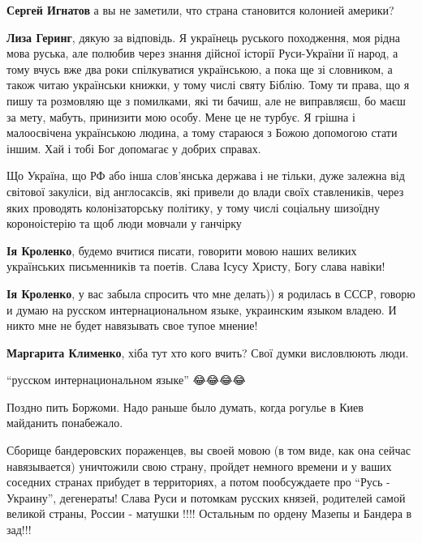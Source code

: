 \begin{itemize}
\begin{itemize}
\textbf{Сергей Игнатов} а вы не заметили, что страна становится колонией америки?

\textbf{Лиза Геринг}, дякую за відповідь. Я українець руського походження, моя
рідна мова руська, але полюбив через знання дійсної історії Руси-України її
народ, а тому вчусь вже два роки спілкуватися українською, а пока ще зі
словником, а також читаю українськи книжки, у тому числі святу Біблію. Тому ти
права, що я пишу та розмовляю ще з помилками, які ти бачиш, але не виправляєш,
бо маєш за мету, мабуть, принизити мою особу. Мене це не турбує. Я грішна і
малоосвічена українською людина, а тому стараюся з Божою допомогою стати іншим.
Хай і тобі Бог допомагає у добрих справах.

Що Україна, що РФ або інша слов'янська держава і не тільки, дуже залежна від
світової закуліси, від англосаксів, які привели до влади своїх ставлеників,
через яких проводять колонізаторську політику, у тому числі соціальну шизоїдну
короноістерію та щоб люди мовчали у ганчірку

\textbf{Ія Кроленко}, будемо вчитися писати, говорити мовою наших великих
українських письменників та поетів. Слава Ісусу Христу, Богу слава навіки!

\textbf{Ія Кроленко}, у вас забыла спросить что мне делать)) я родилась в СССР,
говорю и думаю на русском интернациональном языке, украинским языком владею. И
никто мне не будет навязывать свое тупое мнение!

\textbf{Маргарита Клименко}, хіба тут хто кого вчить? Свої думки висловлюють люди.

\enquote{русском интернациональном языке} 😂😂😂😂

\end{itemize}

Поздно пить Боржоми. Надо раньше было думать, когда рогулье в Киев майданить понабежало.


Сборище бандеровских пораженцев, вы своей мовою (в том виде, как она сейчас
навязывается) уничтожили свою страну, пройдет немного времени и у ваших
соседних странах прибудет в территориях, а потом пообсуждаете про \enquote{Русь -
Украину}, дегенераты! Слава Руси и потомкам русских князей, родителей самой
великой страны, России - матушки !!!! Остальным по ордену Мазепы и Бандера в
зад!!!


\end{itemize}
